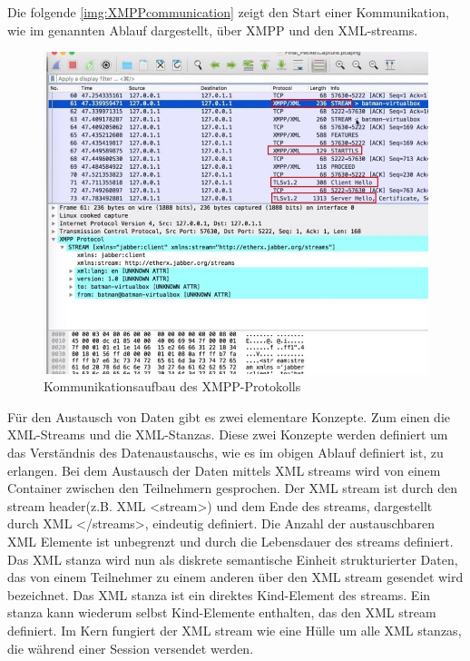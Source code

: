 \documentclass[a4paper,titlepage,halfparskip,12pt]{scrreprt}
\begin{document}
\begin{onehalfspacing}
\pagebreak

Die folgende \autoref{img:XMPPcommunication} zeigt den Start einer Kommunikation, wie im genannten Ablauf dargestellt, über \ac{XMPP} und den \ac{XML}-streams.

\begin{figure}[h]
	\centering
	\includegraphics[width=\textwidth]{images/XML_Wireshark}
	\caption{Kommunikationsaufbau des \ac{XMPP}-Protokolls}
	\label{img:XMPPcommunication}
\end{figure} 

Für den Austausch von Daten gibt es zwei elementare Konzepte. Zum einen die \ac{XML}-Streams und die \ac{XML}-Stanzas. Diese zwei Konzepte werden definiert um das Verständnis des Datenaustauschs, wie es im obigen Ablauf definiert ist, zu erlangen. Bei dem Austausch der Daten mittels \ac{XML} streams wird von einem Container zwischen den Teilnehmern gesprochen. Der \ac{XML} stream ist durch den \glqq stream header\grqq (z.B. \ac{XML} <stream>) und dem Ende des streams, dargestellt durch \ac{XML} </streams>, eindeutig definiert. Die Anzahl der austauschbaren \ac{XML} Elemente ist unbegrenzt und durch die Lebensdauer des streams definiert. Das \ac{XML} stanza wird nun als diskrete semantische Einheit strukturierter Daten, das von einem Teilnehmer zu einem anderen über den \ac{XML} stream gesendet wird bezeichnet. Das \ac{XML} stanza ist ein direktes Kind-Element des streams. Ein stanza kann wiederum selbst Kind-Elemente enthalten, das den \ac{XML} stream definiert. Im Kern fungiert der \ac{XML} stream wie eine Hülle um alle \ac{XML} stanzas, die während einer Session versendet werden.


\end{onehalfspacing}
\end{document}
